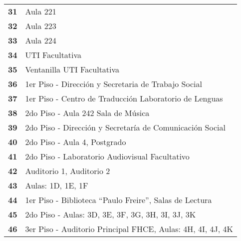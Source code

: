 \begin{longtable}{ c  X }
      \textbf{31}
      &
      Aula 221
      \\


      \textbf{32}
      &
      Aula 223
      \\


      \textbf{33}
      &
      Aula 224
      \\


      \textbf{34}
      &
      UTI Facultativa
      \\


      \textbf{35}
      &
      Ventanilla UTI Facultativa
      \\



      \textbf{36}
      &
      1{\tiny er} Piso - Dirección y Secretaria de Trabajo Social
      \\


      \textbf{37}
      &
      1{\tiny er} Piso - Centro de Traducción Laboratorio de Lenguas
      \\


      \textbf{38}
      &
      2{\tiny do} Piso - Aula 242 Sala de Música
      \\


      \textbf{39}
      &
      2{\tiny do} Piso - Dirección y Secretaría de Comunicación Social
      \\


      \textbf{40}
      &
      2{\tiny do} Piso - Aula 4, Postgrado
      \\


      \textbf{41}
      &
      2{\tiny do} Piso - Laboratorio Audiovisual Facultativo
      \\


      \textbf{42}
      &
      Auditorio 1, Auditorio 2
      \\


      \textbf{43}
      &
      Aulas: 1D, 1E, 1F
      \\


      \textbf{44}
      &
      1{\tiny er} Piso - Biblioteca ``Paulo Freire'', Salas de Lectura
      \\


      \textbf{45}
      &
      2{\tiny do} Piso - Aulas: 3D, 3E, 3F, 3G, 3H, 3I, 3J, 3K
      \\



      \textbf{46}
      &
      3{\tiny er} Piso - Auditorio Principal FHCE,  Aulas: 4H, 4I, 4J, 4K
      \\



\end{longtable}
